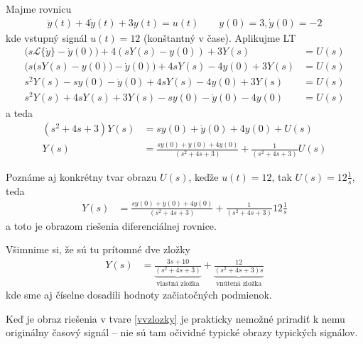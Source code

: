 \documentclass[a4paper, 10pt, ]{article}
\begin{document}
Majme rovnicu
\begin{align}
    \ddot y(t) +4 \dot y(t) + 3y(t) = u(t) \qquad y(0) = 3, \dot y(0) = -2
\end{align}
kde vstupný signál $u(t) = 12$ (konštantný v čase). Aplikujme LT
\begin{subequations}
\begin{align}
    \big( s \mathcal L \{\dot y\} - \dot y(0) \big) + 4 \left( sY(s) - y(0) \right) + 3 Y(s) &=  U(s) \\
    \Big( s \big( sY(s) - y(0) \big) - \dot y(0) \Big) + 4sY(s) - 4y(0) + 3Y(s) &= U(s) \\
    s^2Y(s) - sy(0) - \dot y(0)  + 4sY(s) - 4y(0) + 3Y(s) &= U(s) \\
    s^2Y(s)   + 4sY(s)  + 3Y(s) - sy(0) - \dot y(0) - 4y(0) &= U(s)
\end{align}
\end{subequations}
a teda
\begin{subequations}
\begin{align}
    \left( s^2   + 4s  + 3\right)Y(s) &= sy(0) +  \dot y(0) + 4y(0) + U(s) \\
    Y(s) &= \frac{sy(0) +  \dot y(0) + 4y(0)}{\left( s^2   + 4s  + 3\right)} + \frac{1}{\left( s^2   + 4s  + 3\right)}U(s)
\end{align}
\end{subequations}

\vbox{
Poznáme aj konkrétny tvar obrazu $U(s)$, keďže $u(t) = 12$, tak $U(s) = 12 \frac{1}{s}$, teda
\begin{align}
    Y(s) &= \frac{sy(0) +  \dot y(0) + 4y(0)}{\left( s^2   + 4s  + 3\right)} + \frac{1}{\left( s^2   + 4s  + 3\right)} 12 \frac{1}{s}
\end{align}
a toto je obrazom riešenia diferenciálnej rovnice.
}

Všimnime si, že sú tu prítomné dve zložky
\begin{align} \label{vvzlozky}
    Y(s)
    &=
    \underbrace{
    \frac{3s + 10}{\left( s^2   + 4s  + 3\right)}
    }_{\text{vlastná zložka}}
    +
    \underbrace{
    \frac{12}{\left( s^2   + 4s  + 3\right) s}
    }_{\text{vnútená zložka}}
\end{align}
kde sme aj číselne dosadili hodnoty začiatočných podmienok.


Keď je obraz riešenia v tvare \eqref{vvzlozky} je prakticky nemožné priradiť k nemu originálny časový signál -- nie sú tam očividné typické obrazy typických signálov.
\end{document}
